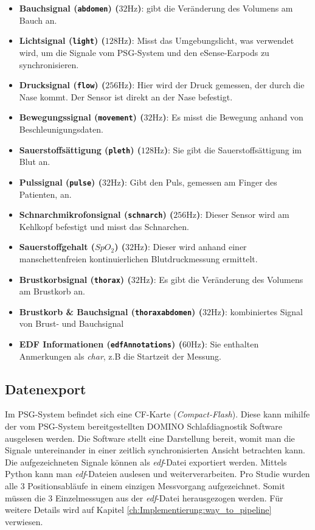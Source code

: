 \begin{itemize}
    \item \textbf{Bauchsignal (\texttt{abdomen}) ($32 \si{\hertz}$)}: gibt die Veränderung des Volumens am Bauch an.
    \item \textbf{Lichtsignal (\texttt{light}) ($128 \si{\hertz}$)}: Misst das Umgebungslicht, was verwendet wird, um die Signale vom PSG-System und den eSense-Earpods zu synchronisieren.
    \item \textbf{Drucksignal (\texttt{flow}) ($256 \si{\hertz}$)}: Hier wird der Druck gemessen, der durch die Nase kommt. Der Sensor ist direkt an der Nase befestigt.
    \item \textbf{Bewegungssignal (\texttt{movement}) ($32 \si{\hertz}$)}: Es misst die Bewegung anhand von Beschleunigungsdaten.
    \item \textbf{Sauerstoffsättigung (\texttt{pleth}) ($128 \si{\hertz}$)}: Sie gibt die Sauerstoffsättigung im Blut an.
    \item \textbf{Pulssignal (\texttt{pulse}) ($32 \si{\hertz}$)}: Gibt den Puls, gemessen am Finger des Patienten, an.
    \item \textbf{Schnarchmikrofonsignal (\texttt{schnarch}) ($256 \si{\hertz}$)}: Dieser Sensor wird am Kehlkopf befestigt und misst das Schnarchen.
    \item \textbf{Sauerstoffgehalt (\texttt{$SpO_2$}) ($32 \si{\hertz}$)}: Dieser wird anhand einer manschettenfreien kontinuierlichen Blutdruckmessung ermittelt.
    \item \textbf{Brustkorbsignal (\texttt{thorax}) ($32 \si{\hertz}$)}: Es gibt die Veränderung des Volumens am Brustkorb an.
    \item \textbf{Brustkorb \& Bauchsignal (\texttt{thoraxabdomen}) ($32 \si{\hertz}$)}: kombiniertes Signal von Brust- und Bauchsignal
    \item \textbf{EDF Informationen (\texttt{edfAnnotations}) ($60 \si{\hertz}$)}: Sie enthalten Anmerkungen als \textit{char}, z.B die Startzeit der Messung.
\end{itemize}

\subsection{Datenexport}
\label{ch:sa:psg:export}

Im PSG-System befindet sich eine CF-Karte (\textit{Compact-Flash}). Diese kann mihilfe der vom PSG-System bereitgestellten {\glqq DOMINO Schlafdiagnostik\grqq} Software ausgelesen werden.
Die Software stellt eine Darstellung bereit, womit man die Signale untereinander in einer zeitlich synchronisierten Ansicht betrachten kann. Die aufgezeichneten Signale können als \textit{edf}-Datei exportiert werden.
Mittels Python kann man \textit{edf}-Dateien auslesen und weiterverarbeiten.
Pro Studie wurden alle 3 Positionsabläufe in einem einzigen Messvorgang aufgezeichnet. Somit müssen die 3 Einzelmessugen aus der \textit{edf}-Datei herausgezogen werden.
Für weitere Details wird auf Kapitel \ref{ch:Implementierung:way_to_pipeline} verwiesen.

